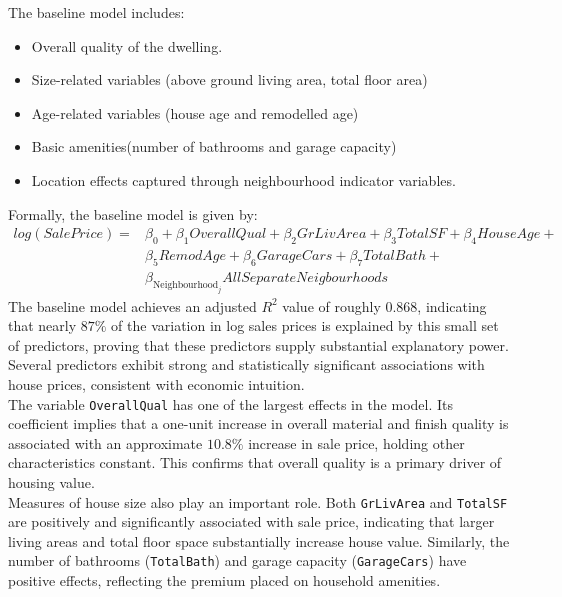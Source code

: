 \documentclass[12pt,oneside]{article} %
\begin{document}
\noindent
The baseline model includes:
\begin{itemize}
    \item Overall quality of the dwelling.
    \item Size-related variables (above ground living area, total floor area)
    \item Age-related variables (house age and remodelled age)
    \item Basic amenities(number of bathrooms and garage capacity)
    \item Location effects captured through neighbourhood indicator variables.
\end{itemize}

\noindent
Formally, the baseline model is given by:
\[
\begin{aligned}
    log(SalePrice) = &\beta_0 + \beta_1OverallQual + \beta_2GrLivArea + \beta_3TotalSF + \beta_4HouseAge+\\ &\beta_5RemodAge + \beta_6GarageCars + \beta_7TotalBath + \\
&\beta_{\text{Neighbourhood}_j} All Separate Neigbourhoods
\end{aligned}
\]
The baseline model achieves an adjusted \(R^2\) value of roughly 0.868, indicating that nearly $87\%$ of the variation in log sales prices is explained by this small set of predictors, proving that these predictors supply substantial explanatory power. Several predictors exhibit strong and statistically significant associations with house prices, consistent with economic intuition.\\

\noindent
The variable \texttt{OverallQual} has one of the largest effects in the model. Its coefficient implies that a one-unit increase in overall material and finish quality is associated with an approximate $10.8\%$ increase in sale price, holding other characteristics constant. This confirms that overall quality is a primary driver of housing value.\\

\noindent
Measures of house size also play an important role.
Both \texttt{GrLivArea} and \texttt{TotalSF} are positively and significantly associated with sale price, indicating that larger living areas and total floor space substantially increase house value. Similarly, the number of bathrooms (\texttt{TotalBath}) and garage capacity (\texttt{GarageCars}) have positive effects, reflecting the premium placed on household amenities.\\
\end{document}
